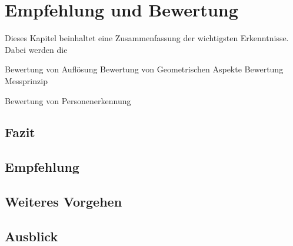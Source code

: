 \chapter{Empfehlung und Bewertung}
\label{Empfehlung_Vorgehen}

Dieses Kapitel beinhaltet eine Zusammenfassung der wichtigsten Erkenntnisse. Dabei werden die 


Bewertung von Auflösung
Bewertung von Geometrischen Aspekte
Bewertung Messprinzip

Bewertung von Personenerkennung

\section{Fazit}
\label{Fazit}


\section{Empfehlung}


\section{Weiteres Vorgehen}


\section{Ausblick}



